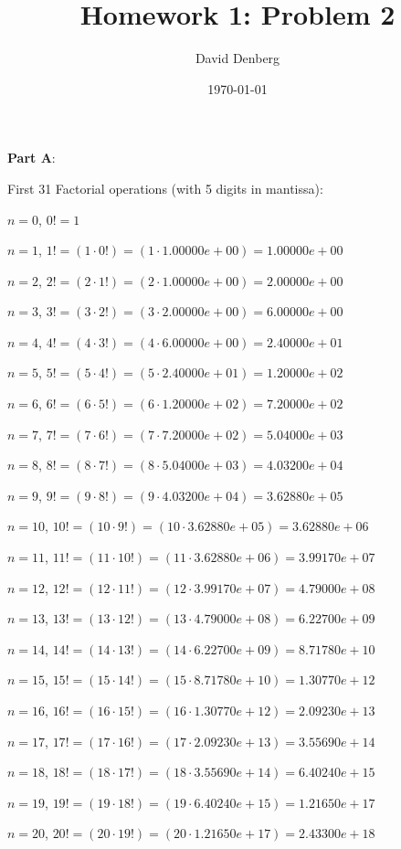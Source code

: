 \documentclass[12pt]{article}
\title{Homework 1: Problem 2}
\author{David Denberg}
\date{\today}
\begin{document}
\maketitle
\noindent
\textbf{Part A}:

First 31 Factorial operations (with 5 digits in mantissa):

$n = 0$, $0! = 1$

$n = 1$, $1! = (1 \cdot 0!) = (1 \cdot 1.00000e+00) = 1.00000e+00$

$n = 2$, $2! = (2 \cdot 1!) = (2 \cdot 1.00000e+00) = 2.00000e+00$

$n = 3$, $3! = (3 \cdot 2!) = (3 \cdot 2.00000e+00) = 6.00000e+00$

$n = 4$, $4! = (4 \cdot 3!) = (4 \cdot 6.00000e+00) = 2.40000e+01$

$n = 5$, $5! = (5 \cdot 4!) = (5 \cdot 2.40000e+01) = 1.20000e+02$

$n = 6$, $6! = (6 \cdot 5!) = (6 \cdot 1.20000e+02) = 7.20000e+02$

$n = 7$, $7! = (7 \cdot 6!) = (7 \cdot 7.20000e+02) = 5.04000e+03$

$n = 8$, $8! = (8 \cdot 7!) = (8 \cdot 5.04000e+03) = 4.03200e+04$

$n = 9$, $9! = (9 \cdot 8!) = (9 \cdot 4.03200e+04) = 3.62880e+05$

$n = 10$, $10! = (10 \cdot 9!) = (10 \cdot 3.62880e+05) = 3.62880e+06$

$n = 11$, $11! = (11 \cdot 10!) = (11 \cdot 3.62880e+06) = 3.99170e+07$

$n = 12$, $12! = (12 \cdot 11!) = (12 \cdot 3.99170e+07) = 4.79000e+08$

$n = 13$, $13! = (13 \cdot 12!) = (13 \cdot 4.79000e+08) = 6.22700e+09$

$n = 14$, $14! = (14 \cdot 13!) = (14 \cdot 6.22700e+09) = 8.71780e+10$

$n = 15$, $15! = (15 \cdot 14!) = (15 \cdot 8.71780e+10) = 1.30770e+12$

$n = 16$, $16! = (16 \cdot 15!) = (16 \cdot 1.30770e+12) = 2.09230e+13$

$n = 17$, $17! = (17 \cdot 16!) = (17 \cdot 2.09230e+13) = 3.55690e+14$

$n = 18$, $18! = (18 \cdot 17!) = (18 \cdot 3.55690e+14) = 6.40240e+15$

$n = 19$, $19! = (19 \cdot 18!) = (19 \cdot 6.40240e+15) = 1.21650e+17$

$n = 20$, $20! = (20 \cdot 19!) = (20 \cdot 1.21650e+17) = 2.43300e+18$
\end{document}
